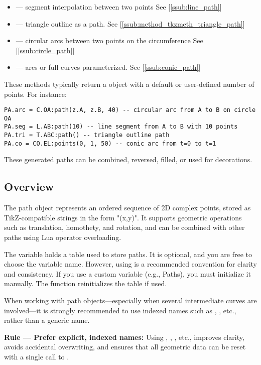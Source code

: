 \begin{itemize}
\item {} — segment interpolation between two points See [\ref{ssub:line_path}]
\item {} — triangle outline as a path. See [\ref{ssub:method_tkzmeth_triangle_path}]
\item {} — circular arcs between two points on the circumference See [\ref{ssub:circle_path}]
\item {} — arcs or full curves parameterized. See [\ref{ssub:conic_path}]
\end{itemize}

These methods typically return a  object with a default or user-defined number of points. For instance:

\begin{verbatim}
PA.arc = C.OA:path(z.A, z.B, 40) -- circular arc from A to B on circle OA
PA.seg = L.AB:path(10) -- line segment from A to B with 10 points
PA.tri = T.ABC:path() -- triangle outline path
PA.co = CO.EL:points(0, 1, 50) -- conic arc from t=0 to t=1
\end{verbatim}

These generated paths can be combined, reversed, filled, or used for \TIKZ{} decorations.


\subsection{Overview}

The path object represents an ordered sequence of 2D complex points, stored as TikZ-compatible strings in the form "(x,y)". It supports geometric operations such as translation, homothety, and rotation, and can be combined with other paths using Lua operator overloading.

The variable  holds a table used to store paths. It is optional, and you are free to choose the variable name. However, using  is a recommended convention for clarity and consistency. If you use a custom variable (e.g., Paths), you must initialize it manually. The  function reinitializes the  table if used.

When working with path objects—especially when several intermediate curves are involved—it is strongly recommended to use indexed names such as , , etc., rather than a generic name.

\begin{mybox}
\textbf{Rule — Prefer explicit, indexed names:}
Using , , , etc., improves clarity, avoids accidental overwriting, and ensures that all geometric data can be reset with a single call to .
\end{mybox}

